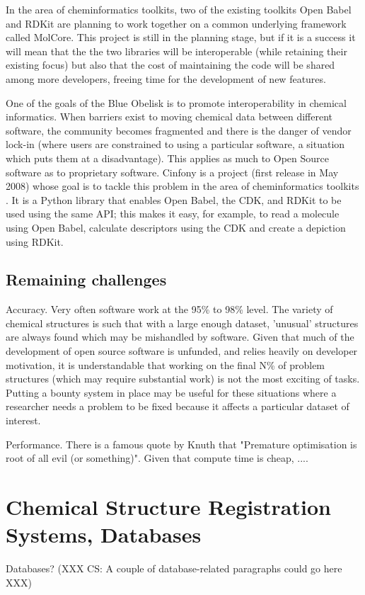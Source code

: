 \documentclass[10pt]{bmc_article}
\newenvironment{bmcformat}{\begin{raggedright}\baselineskip20pt\sloppy\setboolean{publ}{false}}{\end{raggedright}\baselineskip20pt\sloppy}
\begin{document}
\begin{bmcformat}
In the area of cheminformatics toolkits, two of the existing toolkits
Open Babel and RDKit are planning to work together on a common
underlying framework called MolCore.\cite{WebMolCore} This project is still in the
planning stage, but if it is a success it will mean that the the two
libraries will be interoperable (while retaining their existing focus)
but also that the cost of maintaining the code will be shared among
more developers, freeing time for the development of new features.

One of the goals of the Blue Obelisk is to promote interoperability in chemical
informatics. When barriers exist to moving chemical data between
different software, the community becomes fragmented and there is
the danger of vendor lock-in (where users are constrained to using
a particular software, a situation which puts them at a
disadvantage). This applies as much to Open Source software as to
proprietary software. Cinfony is a project (first release in May 2008)
whose goal is to tackle this problem in the area of cheminformatics
toolkits \cite{OBoyleCinfony2008}.
It is a Python library that enables Open Babel, the CDK, and RDKit to
be used using the same API; this makes it easy, for example, to read a
molecule using Open Babel, calculate descriptors using the CDK and
create a depiction using RDKit.

  \subsection*{Remaining challenges}

Accuracy. Very often software work at the 95\% to 98\% level. The
variety of chemical structures is such that with a large enough
dataset, 'unusual' structures are always found which may be mishandled
by software. Given that much of the development of open source
software is unfunded, and relies heavily on developer motivation, it
is understandable that working on the final N\% of problem structures
(which may require substantial work) is not the most exciting of
tasks. Putting a bounty system in place may be useful for these
situations where a researcher needs a problem to be fixed because it
affects a particular dataset of interest.

Performance. There is a famous quote by Knuth that "Premature
optimisation is root of all evil (or something)". Given that compute
time is cheap, ....

\section*{Chemical Structure Registration Systems, Databases}
Databases? (XXX CS: A couple of database-related paragraphs could go here XXX)


\end{bmcformat}
\end{document}
